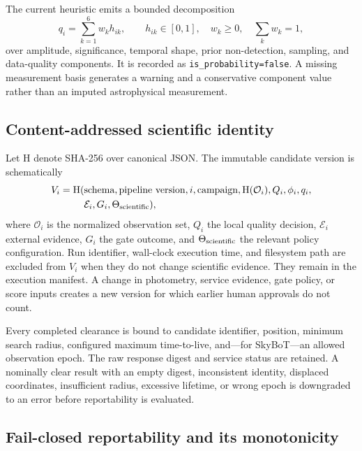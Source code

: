 \documentclass[11pt]{article}
\begin{document}
The current heuristic emits a bounded decomposition
\begin{equation}
  q_i=\sum_{k=1}^{6}w_k h_{ik},
  \qquad h_{ik}\in[0,1],\quad w_k\geq0,\quad \sum_k w_k=1,
\label{eq:iris-score}
\end{equation}
over amplitude, significance, temporal shape, prior non-detection, sampling, and data-quality components. It is recorded as \texttt{is\_probability=false}. A missing measurement basis generates a warning and a conservative component value rather than an imputed astrophysical measurement.

\subsection{Content-addressed scientific identity}

Let $\mathrm{H}$ denote SHA-256 over canonical JSON. The immutable candidate version is schematically
\begin{equation}
\begin{split}
  V_i=\mathrm{H}(&\text{schema},\text{pipeline version},i,\text{campaign},
  \mathrm{H}(\mathcal{O}_i),Q_i,\phi_i,q_i,\\
  &\mathcal{E}_i,G_i,\Theta_{\rm scientific}),
\end{split}
\label{eq:candidate-version}
\end{equation}
where $\mathcal{O}_i$ is the normalized observation set, $Q_i$ the local quality decision, $\mathcal{E}_i$ external evidence, $G_i$ the gate outcome, and $\Theta_{\rm scientific}$ the relevant policy configuration. Run identifier, wall-clock execution time, and filesystem path are excluded from $V_i$ when they do not change scientific evidence. They remain in the execution manifest. A change in photometry, service evidence, gate policy, or score inputs creates a new version for which earlier human approvals do not count.

Every completed clearance is bound to candidate identifier, position, minimum search radius, configured maximum time-to-live, and---for SkyBoT---an allowed observation epoch. The raw response digest and service status are retained. A nominally clear result with an empty digest, inconsistent identity, displaced coordinates, insufficient radius, excessive lifetime, or wrong epoch is downgraded to an error before reportability is evaluated.

\subsection{Fail-closed reportability and its monotonicity}
\end{document}
